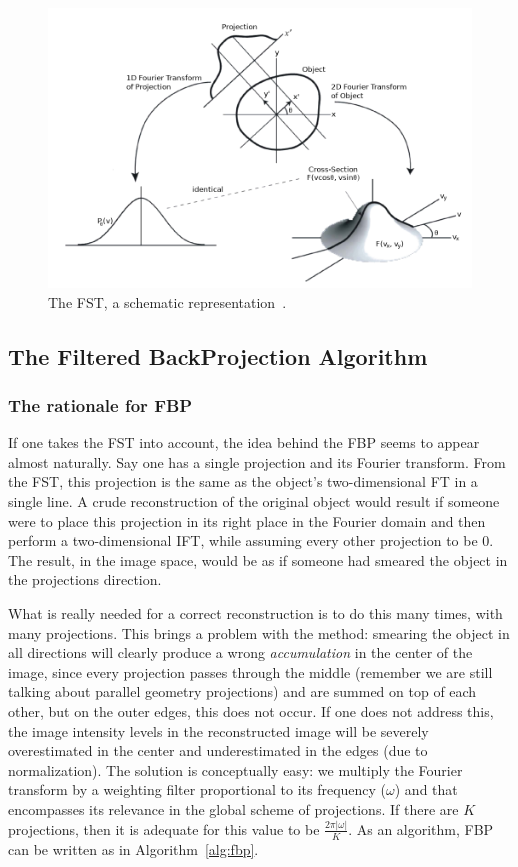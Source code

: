 \begin{figure}[htpb]
    \centering
    \includegraphics[width=.8\textwidth]{img/png/fst.png}
    \caption{The \gls{FST}, a schematic
    representation~\cite{Asl2013a}.}
    \label{fig:fst}
\end{figure}

\subsection{The Filtered BackProjection Algorithm}%
\label{sub:the_filtered_backprojection_algorithm}

\subsubsection{The rationale for \gls{FBP}}%
\label{ssub:the_rationale_for_fbp}

If one takes the \gls{FST} into account, the idea behind the \gls{FBP}
seems to appear almost naturally. Say one has a single projection and
its Fourier transform. From the \gls{FST}, this projection is the same
as the object's two-dimensional \gls{FT} in a single line. A crude
reconstruction of the original object would result if someone were to
place this projection in its right place in the Fourier domain and then
perform a two-dimensional \gls{IFT}, while assuming every other
projection to be 0. The result, in the image space, would be as if
someone had smeared the object in the projections direction.

What is really needed for a correct reconstruction is to do this many
times, with many projections. This brings a problem with the method:
smearing the object in all directions will clearly produce a wrong
\emph{accumulation} in the center of the image, since every projection
passes through the middle (remember we are still talking about parallel
geometry projections) and are summed on top of each other, but on the
outer edges, this does not occur. If one does not address this, the
image intensity levels in the reconstructed image will be severely
overestimated in the center and underestimated in the edges (due to
normalization). The solution is conceptually easy: we multiply the
Fourier transform by a weighting filter proportional to its frequency
($\omega$) and that encompasses its relevance in the global scheme of
projections. If there are $K$ projections, then it is adequate for this
value to be $\frac{2\pi\lvert\omega\rvert}{K}$. As an algorithm,
\gls{FBP} can be written as in Algorithm~\ref{alg:fbp}.

